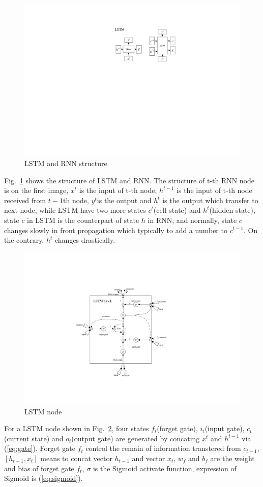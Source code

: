 \documentclass[conference]{IEEEtran}
\begin{document}
      \begin{figure}[htbp]
        \centerline{\includegraphics[width=0.7\linewidth]{figures/LSTM_struc.pdf}}
        \caption{LSTM and RNN structure}
        \label{fig:LSTM}
      \end{figure}

      Fig.~\ref{fig:LSTM} shows the structure of LSTM and RNN. The structure of t-th RNN node is on the first image, $x^t$ is the input of t-th node, $h^{t-1}$ is the input of t-th node received from $t-1$th node, $y^t$is the output and $h^t$ is the output which transfer to next node, while LSTM have two more states $c^t$(cell state) and $h^t$(hidden state), state $c$ in LSTM is the counterpart of state $h$ in RNN, and normally, state $c$ changes slowly in front propagation which typically to add a number to $c^{t-1}$. On the contrary, $h^t$ changes drastically.

      \begin{figure}[htbp]
        \centerline{\includegraphics[width=0.7\linewidth]{figures/LSTM_node.pdf}}
        \caption{LSTM node}
        \label{fig:LSTM2}
      \end{figure}

      For a LSTM node shown in Fig.~\ref{fig:LSTM2}, four states $f_t$(forget gate), $i_t$(input gate), $c_t$(current state) and $o_t$(output gate) are generated by concating $x^t$ and $h^{t-1}$ via (\ref{eq:gate}). Forget gate $f_t$ control the remain of information transtered from $c_{t-1}$, $[h_{t-1}, x_t]$  means to concat vector $h_{t-1}$ and vector $x_t$, $w_f$ and $b_f$ are the weight and bias of forget gate $f_t$, $\sigma$ is the Sigmoid activate function, expression of Sigmoid is (\ref{eq:sigmoid}).
\end{document}
